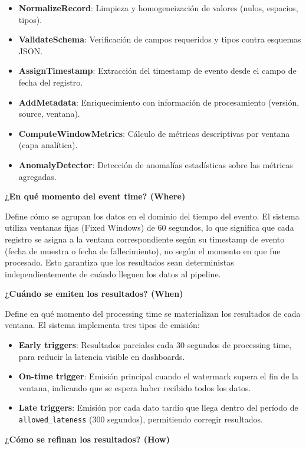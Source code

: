 \documentclass[12pt,a4paper]{article}
\begin{document}
\begin{itemize}
    \item \textbf{NormalizeRecord}: Limpieza y homogeneización de valores (nulos, espacios, tipos).
    \item \textbf{ValidateSchema}: Verificación de campos requeridos y tipos contra esquemas JSON.
    \item \textbf{AssignTimestamp}: Extracción del timestamp de evento desde el campo de fecha del registro.
    \item \textbf{AddMetadata}: Enriquecimiento con información de procesamiento (versión, source, ventana).
    \item \textbf{ComputeWindowMetrics}: Cálculo de métricas descriptivas por ventana (capa analítica).
    \item \textbf{AnomalyDetector}: Detección de anomalías estadísticas sobre las métricas agregadas.
\end{itemize}

\textbf{¿En qué momento del event time? (Where)}

Define cómo se agrupan los datos en el dominio del tiempo del evento. El sistema utiliza ventanas fijas (Fixed Windows) de 60 segundos, lo que significa que cada registro se asigna a la ventana correspondiente según su timestamp de evento (fecha de muestra o fecha de fallecimiento), no según el momento en que fue procesado. Esto garantiza que los resultados sean deterministas independientemente de cuándo lleguen los datos al pipeline.

\textbf{¿Cuándo se emiten los resultados? (When)}

Define en qué momento del processing time se materializan los resultados de cada ventana. El sistema implementa tres tipos de emisión:

\begin{itemize}
    \item \textbf{Early triggers}: Resultados parciales cada 30 segundos de processing time, para reducir la latencia visible en dashboards.
    \item \textbf{On-time trigger}: Emisión principal cuando el watermark supera el fin de la ventana, indicando que se espera haber recibido todos los datos.
    \item \textbf{Late triggers}: Emisión por cada dato tardío que llega dentro del período de \texttt{allowed\_lateness} (300 segundos), permitiendo corregir resultados.
\end{itemize}

\textbf{¿Cómo se refinan los resultados? (How)}
\end{document}
